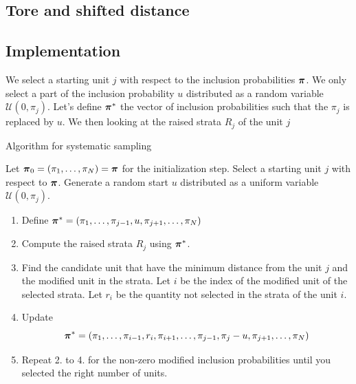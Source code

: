 \documentclass[12pt,english]{article}\usepackage[]{graphicx}\usepackage{xcolor}
\begin{document}

\subsection{Tore and shifted distance}



\subsection{Implementation}

We select a starting unit $j$ with respect to the inclusion probabilities $\boldsymbol{\pi}$. We only select a part of the inclusion probability $u$ distributed as a random variable $\mathcal{U}(0,\pi_j)$. Let's define $\boldsymbol{\pi}^\ast$ the vector of inclusion probabilities such that the $\pi_j$ is replaced by $u$. We then looking at the raised strata $R_j$ of the unit $j$  \\


\begin{algorithm}[htb!]
\caption{Algorithm for systematic sampling}\label{algo:sys}
Let $\boldsymbol{\pi}_0  = (\pi_1, \dots, \pi_N) = \boldsymbol{\pi}$ for the initialization step. Select a starting unit $j$ with respect to $\boldsymbol{\pi}$. Generate a random start $u$ distributed as a uniform variable $\mathcal{U}(0,\pi_j)$.
\begin{enumerate}
  \item Define $\boldsymbol{\pi}^\ast = (\pi_1,\dots,\pi_{j-1},u,\pi_{j+1},\dots,\pi_N)$
	\item Compute the raised strata $R_j$ using $\boldsymbol{\pi}^\ast$.
	\item Find the candidate unit that have the minimum distance from the unit $j$ and the modified unit in the strata. Let $i$ be            the index of the modified unit of the selected strata. Let $r_i$ be the quantity not selected in the strata of the unit $i$.
	\item Update $$\boldsymbol{\pi}^\ast =  (\pi_1,\dots, \pi_{i-1},r_i,\pi_{i+1},\dots,\pi_{j-1},\pi_j-u,\pi_{j+1},\dots,\pi_N)$$
	\item Repeat 2. to 4. for the non-zero modified inclusion probabilities until you selected the right number of units.
\end{enumerate}
\end{algorithm}
\end{document}

